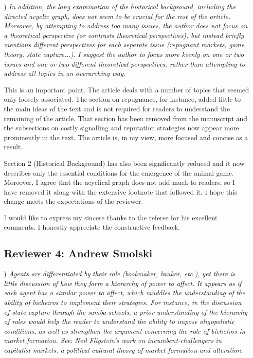 \documentclass[a4paper,12pt]{article}
\begin{document}
\vspace{.5cm}

) \textit{In addition, the long examination of the historical background, including the directed acyclic graph, does not seem to be crucial for the rest of the article. Moreover, by attempting to address too many issues, the author does not focus on a theoretical perspective (or contrasts theoretical perspectives), but instead briefly mentions different perspectives for each separate issue (repugnant markets, game theory, state capture...). I suggest the author to focus more keenly on one or two issues and one or two different theoretical perspectives, rather than attempting to address all topics in an overarching way.}

\vspace{.25cm}

This is an important point. The article deals with a number of topics that seemed only loosely associated. The section on repugnance, for instance, added little to the main ideas of the text and is not required for readers to understand the remaining of the article. That section has been removed from the manuscript and the subsections on costly signalling and reputation strategies now appear more prominently in the text.  The article is, in my view, more focused and concise as a result.

Section 2 (Historical Background) has also been significantly reduced and it now describes only the essential conditions for the emergence of the animal game. Moreover, I agree that the acyclical graph does not add much to readers, so I have removed it along with the extensive footnote that followed it. I hope this change meets the expectations of the reviewer.  

\vspace{.5cm}

I would like to express my sincere thanks to the referee for his excellent comments. I honestly appreciate the constructive feedback.

\newpage

\subsection*{Reviewer 4: Andrew Smolski}%
\label{sub:reviewer_4_andrew_smolski}

) \textit{Agents are differentiated by their role (bookmaker, banker, etc.), yet there is little discussion of how they form a hierarchy of power to affect. It appears as if each agent has a similar power to affect, which muddles the understanding of the ability of bicheiros to implement their strategies. For instance, in the discussion of state capture through the samba schools, a prior understanding of the hierarchy of roles would help the reader to understand the ability to impose oligopolistic conditions, as well as strengthen the argument concerning the role of bicheiros in market formation. See: Neil Fligstein's work on incumbent-challengers in capitalist markets, a political-cultural theory of market formation and alteration}. 
\end{document}
